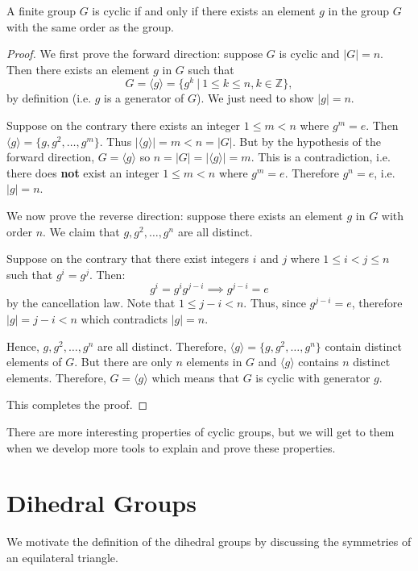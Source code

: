 \begin{theorem}\label{thrm-cyclic-group-has-element-with-same-order}
    A finite group $G$ is cyclic if and only if there exists an element $g$ in the group $G$ with the same order as the group.
\end{theorem}
\begin{proof}
    We first prove the forward direction: suppose $G$ is cyclic and $|G| = n$. Then there exists an element $g$ in $G$ such that
    \[
        G = \langle g \rangle = \{g^k \ | \ 1 \leq k \leq n, k \in \mathbb{Z}\},
    \]
    by definition (i.e. $g$ is a generator of $G$). We just need to show $|g| = n$.

    Suppose on the contrary there exists an integer $1 \leq m < n$ where $g^m = e$. Then $\langle g \rangle = \{g, g^2, \dots, g^m\}$. Thus $|\langle g \rangle| = m < n = |G|$. But by the hypothesis of the forward direction, $G = \langle g \rangle$ so $n = |G| = |\langle g \rangle| = m$. This is a contradiction, i.e. there does \textbf{not} exist an integer $1 \leq m < n$ where $g^m = e$. Therefore $g^n = e$, i.e. $|g| = n$.

    We now prove the reverse direction: suppose there exists an element $g$ in $G$ with order $n$. We claim that $g, g^2, \dots, g^n$ are all distinct.

    Suppose on the contrary that there exist integers $i$ and $j$ where $1 \leq i < j \leq n$ such that $g^i = g^j$. Then:
    \[
        g^i = g^ig^{j-i} \implies g^{j-i} = e
    \]
    by the cancellation law. Note that $1 \leq j - i < n$. Thus, since $g^{j-i} = e$, therefore $|g| = j - i < n$ which contradicts $|g| = n$.

    Hence, $g, g^2, \dots, g^n$ are all distinct. Therefore, $\langle g \rangle = \{g, g^2, \dots, g^n\}$ contain distinct elements of $G$. But there are only $n$ elements in $G$ and $\langle g \rangle$ contains $n$ distinct elements. Therefore, $G = \langle g \rangle$ which means that $G$ is cyclic with generator $g$.

    This completes the proof.
\end{proof}

There are more interesting properties of cyclic groups, but we will get to them when we develop more tools to explain and prove these properties.

\section{Dihedral Groups}
We motivate the definition of the dihedral groups by discussing the symmetries of an equilateral triangle.

